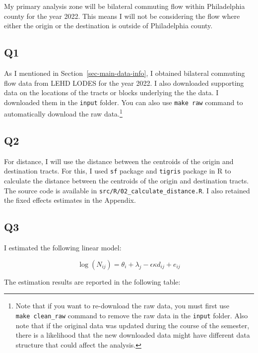 \documentclass[
  11pt]{article}
\begin{document}
My primary analysis zone will be bilateral commuting flow within
Philadelphia county for the year 2022. This means I will not be
considering the flow where either the origin or the destination is
outside of Philadelphia county.

\subsection*{Q1}\label{q1}

As I mentioned in Section~\ref{sec-main-data-info}, I obtained bilateral
commuting flow data from LEHD LODES for the year 2022. I also downloaded
supporting data on the locations of the tracts or blocks underlying the
the data. I downloaded them in the \texttt{input} folder. You can also
use \texttt{make\ raw} command to automatically download the raw
data.\footnote{Note that if you want to re-download the raw data, you
  must first use \texttt{make\ clean\_raw} command to remove the raw
  data in the \texttt{input} folder. Also note that if the original data
  was updated during the course of the semester, there is a likelihood
  that the new downloaded data might have different data structure that
  could affect the analysis.}

\subsection*{Q2}\label{q2}

For distance, I will use the distance between the centroids of the
origin and destination tracts. For this, I used \texttt{sf} package and
\texttt{tigris} package in R to calculate the distance between the
centroids of the origin and destination tracts. The source code is
available in \texttt{src/R/02\_calculate\_distance.R}. I also retained
the fixed effects estimates in the Appendix.

\subsection*{Q3}\label{q3}

I estimated the following linear model:

\[
\log(N_{ij}) = \theta_{i} + \lambda_{j} - \epsilon \kappa d_{ij} + e_{ij}\label{eq:distance}
\]

The estimation results are reported in the following table:

\clearpage
\end{document}
